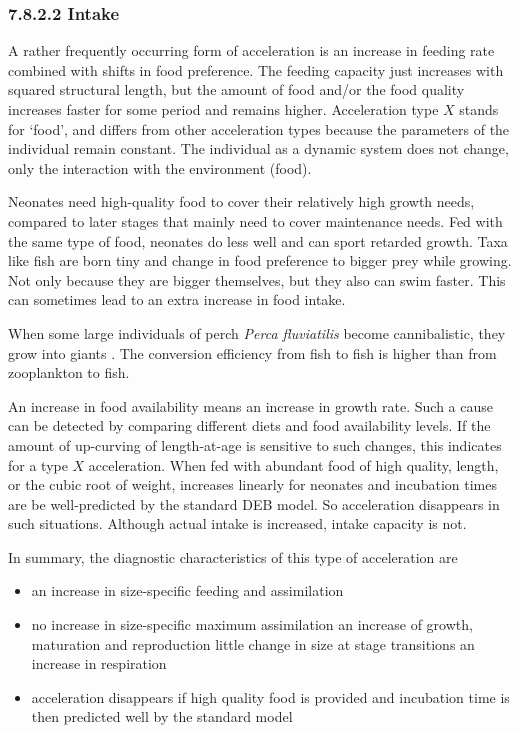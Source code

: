 \subsubsection*{7.8.2.2 Intake}
{}
\label{sssec_c:acceleration_X}

A rather frequently occurring  form of acceleration is an increase in feeding rate combined with shifts in food preference.
The feeding capacity just increases with squared structural length, but the amount of food and/or the food quality increases faster for some period and remains higher.
Acceleration type $X$ stands for `food', and differs from other acceleration types because the parameters of the individual remain constant. 
The individual as a dynamic system does not change, only the interaction with the environment (food).

Neonates need high-quality food to cover their relatively high growth needs, compared to later stages that mainly need to cover maintenance needs.
Fed with the same type of food, neonates do less well and can sport retarded growth.
Taxa like fish are born tiny and change in food preference to bigger prey while growing.
Not only because they are bigger themselves, but they also can swim faster. 
This can sometimes lead to an extra increase in food intake.

When some large individuals of perch \emph{Perca fluviatilis} become cannibalistic, they grow into giants \cite{PersClae2004}.
The conversion efficiency from fish to fish is higher than from zooplankton to fish.

An increase in food availability means an increase in growth rate.
Such a cause can be detected by comparing different diets and food availability levels.
If the amount of up-curving of length-at-age is sensitive to such changes, this indicates for a type $X$ acceleration.
When fed with abundant food of high quality, length, or the cubic root of weight, increases linearly for neonates and incubation times are be well-predicted by the standard DEB model.
So acceleration disappears in such situations.
Although actual intake is increased, intake capacity is not.

In summary, the diagnostic characteristics of this type of acceleration are
\begin{itemize}
  \item an increase in size-specific feeding and assimilation
	\item no increase in size-specific maximum assimilation
	  \subitem an increase of growth, maturation and reproduction
		\subitem little change in size at stage transitions
		\subitem an increase in respiration
	\item acceleration disappears if high quality food is provided and incubation time is then predicted well by the standard model
\end{itemize}

